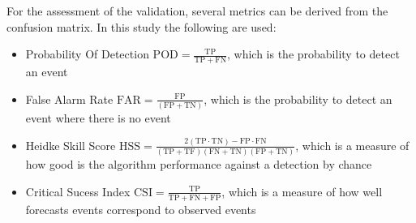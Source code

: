 For the assessment of the validation, several metrics can be derived from the confusion matrix. In this study the following are used:

\begin{itemize}
\item Probability Of Detection $\mathrm{POD} = \frac{\mathrm{TP}}{\mathrm{TP} + \mathrm{FN}}$, which is the probability to detect an event
\item False Alarm Rate $ \mathrm{FAR} = \frac{\mathrm{FP}}{(\mathrm{FP} + \mathrm{TN})} $, which is the probability to detect an event where there is no event
\item Heidke Skill Score \citep{Heidke1926}$ \mathrm{HSS} = \frac{2 (\mathrm{TP} \cdot \mathrm{TN}) - \mathrm{FP} \cdot \mathrm{FN}}{ (\mathrm{TP} + \mathrm{TF}) (\mathrm{FN} + \mathrm{TN}) (\mathrm{FP} + \mathrm{TN})}$, which is a measure of how good is the algorithm performance against a detection by chance
\item Critical Sucess Index $ \mathrm{CSI} = \frac{\mathrm{TP}}{\mathrm{TP} + \mathrm{FN} + \mathrm{FP}}$, which is a measure of how well forecasts events correspond to observed events 
\end{itemize}